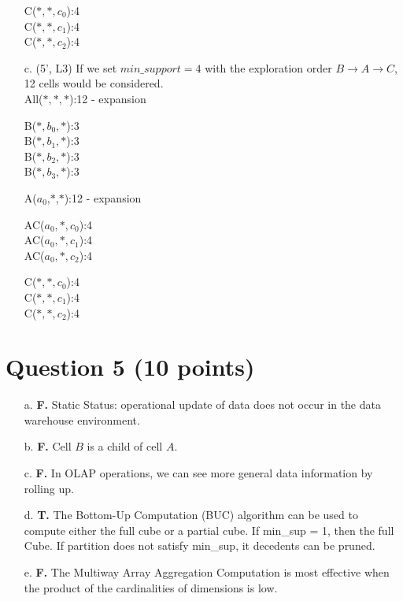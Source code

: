 \begin{itemize}
\underline{\hspace{ 1in}}

C($*,*,c_0$):4\\
C($*,*,c_1$):4\\
C($*,*,c_2$):4\\

\item[c.] (5', L3) If we set $min\_support = 4$ with the exploration order $B \rightarrow A \rightarrow C$, 12 cells would be considered.\\
All($*,*,*$):12 - expansion

\underline{\hspace{ 1in}}

B($*,b_0,*$):3\\
B($*,b_1,*$):3\\
B($*,b_2,*$):3\\
B($*,b_3,*$):3

\underline{\hspace{ 1in}}

A($a_0$,$*$,$*$):12 - expansion

\underline{\hspace{ 1in}}

AC($a_0,*,c_0$):4\\
AC($a_0,*,c_1$):4\\
AC($a_0,*,c_2$):4

\underline{\hspace{ 1in}}

C($*,*,c_0$):4\\
C($*,*,c_1$):4\\
C($*,*,c_2$):4\\

\end{itemize}


\section*{Question 5 (10 points)}
\begin{itemize}
\item[a.] \textbf{F.}  Static Status: operational update of data does not occur in the data warehouse environment.
\item[b.] \textbf{F.}  Cell $B$ is a child of cell $A$.
\item[c.] \textbf{F.}  In OLAP operations, we can see more general data information by rolling up.
\item[d.] \textbf{T.}  The Bottom-Up Computation (BUC) algorithm can be used to compute either the full cube or a partial cube. If {min\_sup} = 1, then the full Cube. If partition does not satisfy {min\_sup}, it decedents can be pruned.
\item[e.] \textbf{F.} The Multiway Array Aggregation Computation is most effective when the product of the cardinalities of dimensions is low.
\end{itemize}

